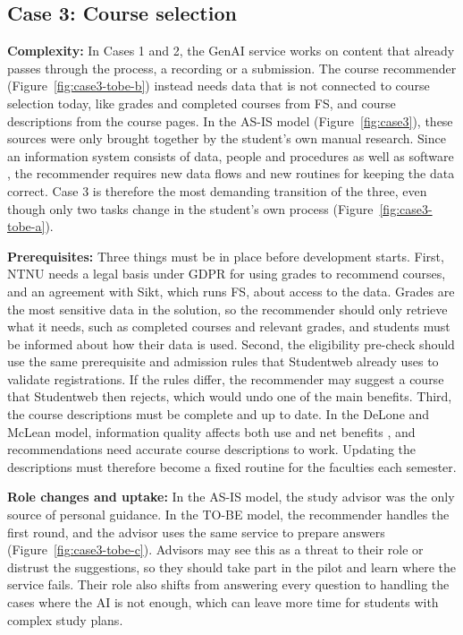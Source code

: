 \subsection{Case 3: Course selection}

\textbf{Complexity:}
In Cases 1 and 2, the GenAI service works on content that already passes through the process, a recording or a submission. The course recommender (Figure~\ref{fig:case3-tobe-b}) instead needs data that is not connected to course selection today, like grades and completed courses from FS, and course descriptions from the course pages. In the AS-IS model (Figure~\ref{fig:case3}), these sources were only brought together by the student's own manual research. Since an information system consists of data, people and procedures as well as software \parencite{toussaint2025}, the recommender requires new data flows and new routines for keeping the data correct. Case 3 is therefore the most demanding transition of the three, even though only two tasks change in the student's own process (Figure~\ref{fig:case3-tobe-a}).

\textbf{Prerequisites:}
Three things must be in place before development starts. First, NTNU needs a legal basis under GDPR for using grades to recommend courses, and an agreement with Sikt, which runs FS, about access to the data. Grades are the most sensitive data in the solution, so the recommender should only retrieve what it needs, such as completed courses and relevant grades, and students must be informed about how their data is used. Second, the eligibility pre-check should use the same prerequisite and admission rules that Studentweb already uses to validate registrations. If the rules differ, the recommender may suggest a course that Studentweb then rejects, which would undo one of the main benefits. Third, the course descriptions must be complete and up to date. In the DeLone and McLean model, information quality affects both use and net benefits \parencite{stair}, and recommendations need accurate course descriptions to work. Updating the descriptions must therefore become a fixed routine for the faculties each semester.

\textbf{Role changes and uptake:}
In the AS-IS model, the study advisor was the only source of personal guidance. In the TO-BE model, the recommender handles the first round, and the advisor uses the same service to prepare answers (Figure~\ref{fig:case3-tobe-c}). Advisors may see this as a threat to their role or distrust the suggestions, so they should take part in the pilot and learn where the service fails. Their role also shifts from answering every question to handling the cases where the AI is not enough, which can leave more time for students with complex study plans.

